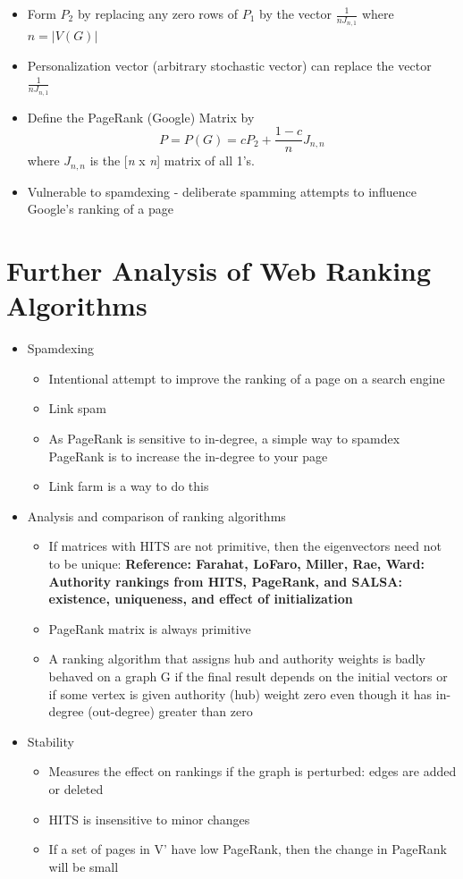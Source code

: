 \documentclass[11pt]{report}
\begin{document}
\begin{itemize}
\item Form $P_2$ by replacing any zero rows of $P_1$ by the vector \(\frac{1}{nJ_{n,1}}\) where \(n=|V(G)|\)
\item Personalization vector (arbitrary stochastic vector) can replace the vector \(\frac{1}{nJ_{n,1}}\)
\item Define the PageRank (Google) Matrix by \[P = P(G) = cP_2 +\frac{1-c}{n}J_{n,n} \] where $J_{n,n}$ is the [\textit{n} x \textit{n}] matrix of all 1's.
\item Vulnerable to spamdexing - deliberate spamming attempts to influence Google's ranking of a page

\end{itemize}
\section{Further Analysis of Web Ranking Algorithms}
\begin{itemize}
\item Spamdexing
\begin{itemize}
\item Intentional attempt to improve the ranking of a page on a search engine 
\item Link spam
\item As PageRank is sensitive to in-degree, a simple way to spamdex PageRank is to increase the in-degree to your page
\item Link farm is a way to do this
\end{itemize}
\item Analysis and comparison of ranking algorithms
\begin{itemize}
\item If matrices with HITS are not primitive, then the eigenvectors need not to be unique: \textbf{Reference: Farahat, LoFaro, Miller, Rae, Ward: Authority rankings from HITS, PageRank, and SALSA: existence, uniqueness, and effect of initialization}
\item PageRank matrix is always primitive
\item A ranking algorithm that assigns hub and authority weights is badly behaved on a graph G if the final result depends on the initial vectors or if some vertex is given authority (hub) weight zero even though it has in-degree (out-degree) greater than zero
\end{itemize}
\item Stability
\begin{itemize}
\item Measures the effect on rankings if the graph is perturbed: edges are added or deleted
\item HITS is insensitive to minor changes
\item If a set of pages in V' have low PageRank, then the change in PageRank will be small
\end{itemize}
\end{itemize}
\end{document}
